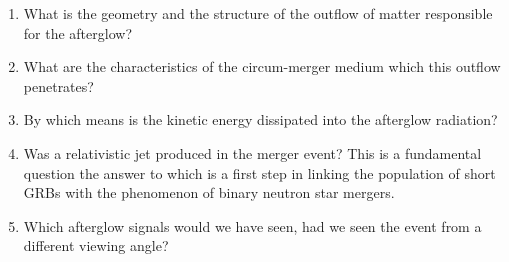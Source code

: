 \begin{enumerate}
	\item What is the geometry and the structure of the outflow of matter responsible for the afterglow?
	\item What are the characteristics of the circum-merger medium which this outflow penetrates?
	\item By which means is the kinetic energy dissipated into the afterglow radiation?
	\item Was a relativistic jet produced in the merger event? This is a fundamental question the answer to which is a first step in linking the population of short GRBs with the phenomenon of binary neutron star mergers.
	\item Which afterglow signals would we have seen, had we seen the event from a different viewing angle?
\end{enumerate}
